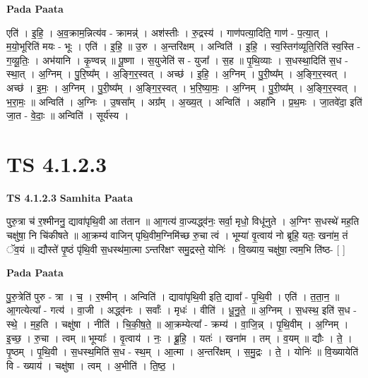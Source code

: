 \documentclass[17pt]{extarticle}
\begin{document}
\textbf{Pada Paata} \newline

एति॑ । इ॒हि॒ । अ॒व॒क्राम॒न्नित्य॑व - क्रामन्न्॑ । अश॑स्तीः । रु॒द्रस्य॑ । गाण॑पत्या॒दिति॒ गाण॑ - प॒त्या॒त् । म॒यो॒भूरिति॑ मयः - भूः । एति॑ । इ॒हि॒ ॥ उ॒रु । अ॒न्तरि॑क्षम् । अन्विति॑ । इ॒हि॒ । स्व॒स्तिग॑व्यूति॒रिति॑ स्व॒स्ति - ग॒व्यू॒तिः॒ । अभ॑यानि । कृ॒ण्वन्न् ॥ पू॒ष्णा । स॒युजेति॑ स - युजा᳚ । स॒ह ॥ पृ॒थि॒व्याः । स॒धस्था॒दिति॑ स॒ध - स्था॒त् । अ॒ग्निम् । पु॒रि॒ष्य᳚म् । अ॒ङ्गि॒र॒स्वत् । अच्छ॑ । इ॒हि॒ । अ॒ग्निम् । पु॒री॒ष्य᳚म् । अ॒ङ्गि॒र॒स्वत् । अच्छ॑ । इ॒मः॒ । अ॒ग्निम् । पु॒री॒ष्य᳚म् । अ॒ङ्गि॒र॒स्वत् । भ॒रि॒ष्या॒मः॒ । अ॒ग्निम् । पु॒री॒ष्य᳚म् । अ॒ङ्गि॒र॒स्वत् । भ॒रा॒मः॒ ॥ अन्विति॑ । अ॒ग्निः । उ॒षसा᳚म् । अग्र᳚म् । अ॒ख्य॒त् । अन्विति॑ । अहा॑नि । प्र॒थ॒मः । जा॒तवे॑दा॒ इति॑ जा॒त - वे॒दाः॒ ॥ अन्विति॑ । सूर्य॑स्य ।  \newline





\section{ TS 4.1.2.3 }

\textbf{TS 4.1.2.3 } \newline
\textbf{Samhita Paata} \newline

पुरु॒त्रा च॑ र॒श्मीननु॒ द्यावा॑पृथि॒वी आ त॑तान ॥ आ॒गत्य॑ वा॒ज्यद्ध्व॑नः॒ सर्वा॒ मृधो॒ विधू॑नुते । अ॒ग्निꣳ स॒धस्थे॑ मह॒ति चक्षु॑षा॒ नि चि॑कीषते ॥ आ॒क्रम्य॑ वाजिन् पृथि॒वीम॒ग्निमि॑च्छ रु॒चा त्वं । भूम्या॑ वृ॒त्वाय॑ नो ब्रूहि॒ यतः॒ खना॑म॒ तं ॅव॒यं ॥ द्यौस्ते॑ पृ॒ष्ठं पृ॑थि॒वी स॒धस्थ॑मा॒त्मा ऽन्तरि॑क्षꣳ समु॒द्रस्ते॒ योनिः॑ । वि॒ख्याय॒ चक्षु॑षा॒ त्वम॒भि ति॑ष्ठ- [  ] \newline

\textbf{Pada Paata} \newline

पु॒रु॒त्रेति॑ पुरु - त्रा । च॒ । र॒श्मीन् । अन्विति॑ । द्यावा॑पृथि॒वी इति॒ द्यावा᳚ - पृ॒थि॒वी । एति॑ । त॒ता॒न॒ ॥ आ॒गत्येत्या᳚ - गत्य॑ । वा॒जी । अद्ध्व॑नः । सर्वाः᳚ । मृधः॑ । वीति॑ । धू॒नु॒ते॒ ॥ अ॒ग्निम् । स॒धस्थ॒ इति॑ स॒ध - स्थे॒ । म॒ह॒ति । चक्षु॑षा । नीति॑ । चि॒की॒ष॒ते॒ ॥ आ॒क्रम्येत्या᳚ - क्रम्य॑ । वा॒जि॒न्न् । पृ॒थि॒वीम् । अ॒ग्निम् । इ॒च्छ॒ । रु॒चा । त्वम् ॥ भूम्याः᳚ । वृ॒त्वाय॑ । नः॒ । ब्रू॒हि॒ । यतः॑ । खना॑म । तम् । व॒यम् ॥ द्यौः । ते॒ । पृ॒ष्ठम् । पृ॒थि॒वी । स॒धस्थ॒मिति॑ स॒ध - स्थ॒म् । आ॒त्मा । अ॒न्तरि॑क्षम् । स॒मु॒द्रः । ते॒ । योनिः॑ ॥ वि॒ख्यायेति॑ वि - ख्याय॑ । चक्षु॑षा । त्वम् । अ॒भीति॑ । ति॒ष्ठ॒ ।  \newline
\end{document}

